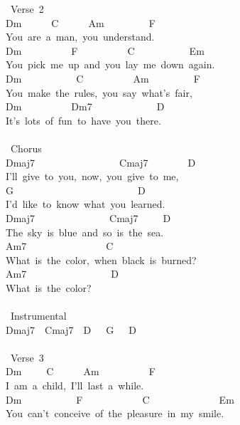 {\lbrack\ Verse\ 2\rbrack\\
Dm\ \ \ \ \ \ C\ \ \ \ \ \ Am\ \ \ \ \ \ \ \ \ F\ \\
You\ are\ a\ man,\ you\ understand.\ \\
Dm\ \ \ \ \ \ \ \ \ \ F\ \ \ \ \ \ \ \ \ \ C\ \ \ \ \ \ \ \ \ \ \ Em\\
You\ pick\ me\ up\ and\ you\ lay\ me\ down\ again.\ \\
Dm\ \ \ \ \ \ \ \ \ \ \ C\ \ \ \ \ \ \ \ \ \ Am\ \ \ \ \ \ \ \ \ F\ \\
You\ make\ the\ rules,\ you\ say\ what's\ fair,\ \\
Dm\ \ \ \ \ \ \ \ \ \ Dm7\ \ \ \ \ \ \ \ \ \ \ \ \ D\\
It's\ lots\ of\ fun\ to\ have\ you\ there.\ \\
\\
\lbrack\ Chorus\rbrack\\
Dmaj7\ \ \ \ \ \ \ \ \ \ \ \ \ \ \ \ \ Cmaj7\ \ \ \ \ \ \ \ D\ \\
I'll\ give\ to\ you,\ now,\ you\ give\ to\ me,\ \\
G\ \ \ \ \ \ \ \ \ \ \ \ \ \ \ \ \ \ \ \ \ \ \ \ \ D\ \\
I'd\ like\ to\ know\ what\ you\ learned.\ \\
Dmaj7\ \ \ \ \ \ \ \ \ \ \ \ \ \ \ Cmaj7\ \ \ \ \ D\ \\
The\ sky\ is\ blue\ and\ so\ is\ the\ sea.\ \\
Am7\ \ \ \ \ \ \ \ \ \ \ \ \ \ \ \ C\ \\
What\ is\ the\ color,\ when\ black\ is\ burned?\ \\
Am7\ \ \ \ \ \ \ \ \ \ \ \ \ \ \ \ \ D\ \\
What\ is\ the\ color?\\
\\
\lbrack\ Instrumental\rbrack\\
Dmaj7\ \ Cmaj7\ \ D\ \ \ G\ \ \ D\\
\\
\lbrack\ Verse\ 3\rbrack\ \\
Dm\ \ \ \ \ C\ \ \ \ \ \ Am\ \ \ \ \ \ \ \ \ \ F\ \\
I\ am\ a\ child,\ I'll\ last\ a\ while.\ \\
Dm\ \ \ \ \ \ \ \ \ \ \ F\ \ \ \ \ \ \ \ \ \ \ \ C\ \ \ \ \ \ \ \ \ \ \ \ \ \ Em\ \\
You\ can't\ conceive\ of\ the\ pleasure\ in\ my\ smile.\ }


